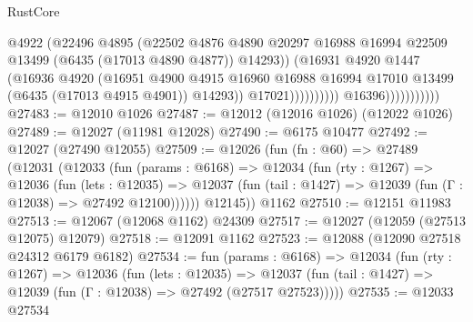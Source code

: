 \begin{lexlean}{RustCore}
\begin{coremodule}
                                            @4922
                                            (@22496
                                              @4895
                                              (@22502
                                                @4876
                                                @4890
                                                @20297
                                                @16988
                                                @16994
                                                @22509
                                                @13499
                                                (@6435 (@17013 @4890 @4877))
                                                @14293))
                                            (@16931
                                              @4920
                                              @1447
                                              (@16936
                                                @4920
                                                (@16951
                                                  @4900
                                                  @4915
                                                  @16960
                                                  @16988
                                                  @16994
                                                  @17010
                                                  @13499
                                                  (@6435 (@17013 @4915 @4901))
                                                  @14293))
                                              @17021))))))))))
                          @16396)))))))))))
@27483 := @12010 @1026
@27487 := @12012 (@12016 @1026) (@12022 @1026)
@27489 := @12027 (@11981 @12028)
@27490 := @6175 @10477
@27492 := @12027 (@27490 @12055)
@27509 := @12026
    (fun (fn : @60) =>
    @27489
      (@12031
        (@12033
          (fun (params : @6168) =>
          @12034
            (fun (rty : @1267) =>
            @12036
              (fun (lets : @12035) =>
              @12037 (fun (tail : @1427) => @12039 (fun (Γ : @12038) => @27492 @12100))))))
        @12145))
    @1162
@27510 := @12151 @11983
@27513 := @12067 (@12068 @1162) @24309
@27517 := @12027 (@12059 (@27513 @12075) @12079)
@27518 := @12091 @1162
@27523 := @12088 (@12090 @27518 @24312 @6179 @6182)
@27534 := fun (params : @6168) =>
  @12034
    (fun (rty : @1267) =>
    @12036
      (fun (lets : @12035) =>
      @12037 (fun (tail : @1427) => @12039 (fun (Γ : @12038) => @27492 (@27517 @27523)))))
@27535 := @12033 @27534

\end{coremodule}
\end{lexlean}
